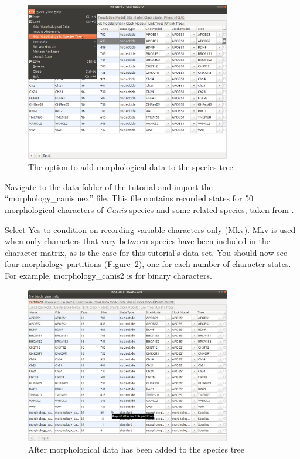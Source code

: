 \documentclass[12pt]{article}
\begin{document}
\begin{figure}[htb!]
\centering
\includegraphics[width=0.8\textwidth]{figures/addMorphology.png}
\caption
{The option to add morphological data to the species tree}
\label{fig:addMorphology}
\end{figure}

Navigate to the data folder of the tutorial and import the
``morphology\_canis.nex'' file. This file contains recorded states for 50
morphological characters of \textit{Canis} species and some related species,
taken from \cite{Slater2015}.

Select Yes to condition on recording variable characters only (Mkv). Mkv is
used when only characters that vary between species have been included in the
character matrix, as is the case for this tutorial's data set. You
should now see four morphology partitions
(Figure~\ref{fig:morphologyPartitions}), one for each number of character
states. For example, morphology\_canis2 is for binary characters.

\begin{figure}[htb!]
\centering
\includegraphics[width=0.8\textwidth]{figures/morphologyPartitions.png}
\caption
{After morphological data has been added to the species tree}
\label{fig:morphologyPartitions}
\end{figure}
\end{document}
